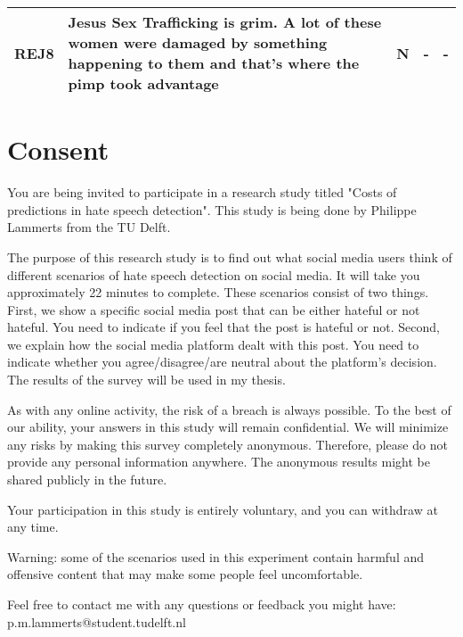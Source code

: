 \begin{table}
\begin{tabular}{lp{12cm}ccc}
        \textbf{REJ8}              & Jesus Sex Trafficking is grim. A lot of these women were damaged by something happening to them and that's where the pimp took advantage                                                                                                                                                                                                     & N                                        & -                                   & -                                          \\
        \bottomrule
    \end{tabular}
\end{table}

\section{Consent}
\begin{flushleft}
    You are being invited to participate in a research study titled "Costs of predictions in hate speech detection". This study is being done by Philippe Lammerts from the TU Delft.
\end{flushleft}
\begin{flushleft}
    The purpose of this research study is to find out what social media users think of different scenarios of hate speech detection on social media. It will take you approximately 22 minutes to complete. These scenarios consist of two things. First, we show a specific social media post that can be either hateful or not hateful. You need to indicate if you feel that the post is hateful or not. Second,  we explain how the social media platform dealt with this post. You need to indicate whether you agree/disagree/are neutral about the platform's decision. The results of the survey will be used in my thesis.
\end{flushleft}
\begin{flushleft}
    As with any online activity, the risk of a breach is always possible. To the best of our ability, your answers in this study will remain confidential. We will minimize any risks by making this survey completely anonymous. Therefore, please do not provide any personal information anywhere. The anonymous results might be shared publicly in the future.
\end{flushleft}
\begin{flushleft}
    Your participation in this study is entirely voluntary, and you can withdraw at any time.
\end{flushleft}
\begin{flushleft}
    Warning: some of the scenarios used in this experiment contain harmful and offensive content that may make some people feel uncomfortable.
\end{flushleft}
\begin{flushleft}
    Feel free to contact me with any questions or feedback you might have:
    p.m.lammerts@student.tudelft.nl
\end{flushleft}

